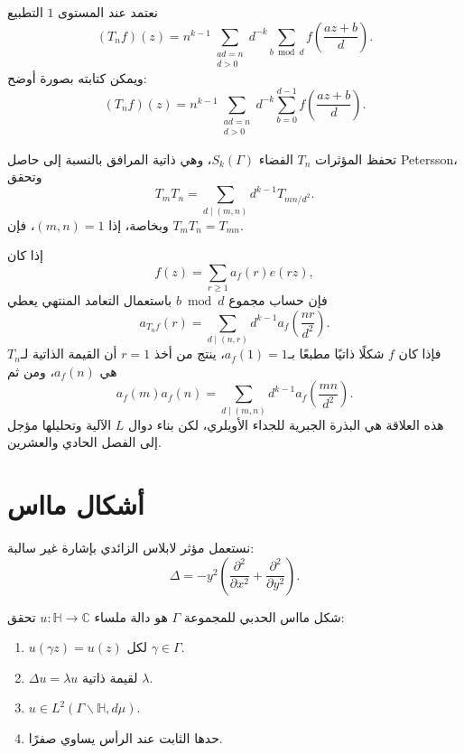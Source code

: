 نعتمد عند المستوى \(1\) التطبيع
\[
(T_nf)(z)
=
n^{k-1}
\sum_{\substack{ad=n\\d>0}}d^{-k}
\sum_{b\bmod d}f\!\left(\frac{az+b}{d}\right).
\]
ويمكن كتابته بصورة أوضح:
\[
(T_nf)(z)
=n^{k-1}\sum_{\substack{ad=n\\d>0}}d^{-k}
\sum_{b=0}^{d-1}f\!\left(\frac{az+b}{d}\right).
\]

\begin{theorem}
\label{thm:hecke-relations-level-one}
تحفظ المؤثرات \(T_n\) الفضاء \(S_k(\Gamma)\)، وهي ذاتية المرافق بالنسبة
إلى حاصل Petersson، وتحقق
\[
T_mT_n
=
\sum_{d\mid(m,n)}d^{k-1}T_{mn/d^2}.
\]
وبخاصة، إذا \((m,n)=1\)، فإن \(T_mT_n=T_{mn}\).
\end{theorem}

إذا كان
\[
f(z)=\sum_{r\ge1}a_f(r)e(rz),
\]
فإن حساب مجموع \(b\bmod d\) باستعمال التعامد المنتهي يعطي
\[
a_{T_nf}(r)
=
\sum_{d\mid(n,r)}d^{k-1}a_f\!\left(\frac{nr}{d^2}\right).
\]
فإذا كان \(f\) شكلًا ذاتيًا مطبعًا بـ\(a_f(1)=1\)، ينتج من أخذ
\(r=1\) أن القيمة الذاتية لـ\(T_n\) هي \(a_f(n)\)، ومن ثم
\[
a_f(m)a_f(n)
=
\sum_{d\mid(m,n)}d^{k-1}a_f\!\left(\frac{mn}{d^2}\right).
\]
هذه العلاقة هي البذرة الجبرية للجداء الأويلري، لكن بناء دوال \(L\)
الآلية وتحليلها مؤجل إلى الفصل الحادي والعشرين.

\section{أشكال مااس}

نستعمل مؤثر لابلاس الزائدي بإشارة غير سالبة:
\[
\Delta=-y^2\left(\frac{\partial^2}{\partial x^2}
+\frac{\partial^2}{\partial y^2}\right).
\]

\begin{definition}
\label{def:maass-cusp-form}
شكل مااس الحدبي للمجموعة \(\Gamma\) هو دالة ملساء
\(u:\mathbb H\to\mathbb C\) تحقق:
\begin{enumerate}
  \item \(u(\gamma z)=u(z)\) لكل \(\gamma\in\Gamma\).
  \item \(\Delta u=\lambda u\) لقيمة ذاتية \(\lambda\).
  \item \(u\in L^2(\Gamma\backslash\mathbb H,d\mu)\).
  \item حدها الثابت عند الرأس يساوي صفرًا.
\end{enumerate}
\end{definition}

